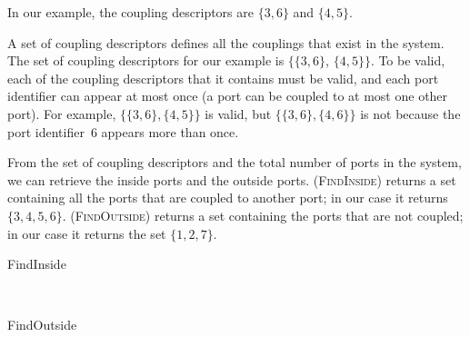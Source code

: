 In our example, the coupling descriptors are $\lbrace 3, 6 \rbrace$ and $\lbrace 4, 5 \rbrace$.

A set of coupling descriptors defines all the couplings that exist in the system.
The set of coupling descriptors for our example is
$\lbrace \lbrace 3, 6 \rbrace$, $\lbrace 4, 5 \rbrace \rbrace$.
To be valid, each of the coupling descriptors that it contains must be valid, and each port identifier can appear at most once (a port can be coupled to at most one other port).
For example,
$\lbrace \lbrace 3, 6 \rbrace, \lbrace 4, 5 \rbrace \rbrace$
is valid, but 
$\lbrace \lbrace 3, 6 \rbrace, \lbrace 4, 6 \rbrace \rbrace$
is not because the port identifier~6 appears more than once.

From the set of coupling descriptors and the total number of ports in the system, we can retrieve the inside ports and the outside ports.
 (\textsc{FindInside}) returns a set containing all the ports that are coupled to another port; in our case it returns $\lbrace 3, 4, 5, 6 \rbrace$.
 (\textsc{FindOutside}) returns a set containing the ports that are not coupled; in our case it returns the set $\lbrace 1, 2, 7 \rbrace$.

\begin{algorithm}[hbtp]
    \caption{FindInside}
    \label{algo:find_inside}
    \begin{algorithmic}
         
        \EndFor
        \\  
        \EndFunction
    \end{algorithmic}
\end{algorithm}

\begin{algorithm}[hbtp]
    \caption{FindOutside}
    \label{algo:find_outside}
    \begin{algorithmic}
         
         
        \\  
        \EndFunction
    \end{algorithmic}
\end{algorithm}


